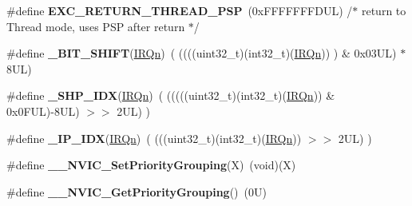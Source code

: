 \begin{DoxyCompactItemize}
\item 
\mbox{\label{group___c_m_s_i_s___core___n_v_i_c_functions_ga9998daf0fbdf31dbc8f81cd604b58175}} 
\#define {\bfseries E\+X\+C\+\_\+\+R\+E\+T\+U\+R\+N\+\_\+\+T\+H\+R\+E\+A\+D\+\_\+\+P\+SP}~(0x\+F\+F\+F\+F\+F\+F\+F\+D\+U\+L)     /$\ast$ return to Thread mode, uses P\+S\+P after return                                $\ast$/
\item 
\mbox{\label{group___c_m_s_i_s___core___n_v_i_c_functions_ga53c75b28823441c6153269f0ecbed878}} 
\#define {\bfseries \+\_\+\+B\+I\+T\+\_\+\+S\+H\+I\+FT}(\mbox{\hyperlink{group___interrupt__vector__numbers_ga666eb0caeb12ec0e281415592ae89083}{I\+R\+Qn}})~(  ((((uint32\+\_\+t)(int32\+\_\+t)(\mbox{\hyperlink{group___interrupt__vector__numbers_ga666eb0caeb12ec0e281415592ae89083}{I\+R\+Qn}}))         )      \&  0x03\+U\+L) $\ast$ 8\+U\+L)
\item 
\mbox{\label{group___c_m_s_i_s___core___n_v_i_c_functions_gaee4f7eb5d7e770ad51489dbceabb1755}} 
\#define {\bfseries \+\_\+\+S\+H\+P\+\_\+\+I\+DX}(\mbox{\hyperlink{group___interrupt__vector__numbers_ga666eb0caeb12ec0e281415592ae89083}{I\+R\+Qn}})~( (((((uint32\+\_\+t)(int32\+\_\+t)(\mbox{\hyperlink{group___interrupt__vector__numbers_ga666eb0caeb12ec0e281415592ae89083}{I\+R\+Qn}})) \& 0x0\+F\+U\+L)-\/8\+U\+L) $>$$>$    2\+U\+L)      )
\item 
\mbox{\label{group___c_m_s_i_s___core___n_v_i_c_functions_ga370ec4b1751a6a889d849747df3763a9}} 
\#define {\bfseries \+\_\+\+I\+P\+\_\+\+I\+DX}(\mbox{\hyperlink{group___interrupt__vector__numbers_ga666eb0caeb12ec0e281415592ae89083}{I\+R\+Qn}})~(   (((uint32\+\_\+t)(int32\+\_\+t)(\mbox{\hyperlink{group___interrupt__vector__numbers_ga666eb0caeb12ec0e281415592ae89083}{I\+R\+Qn}}))                $>$$>$    2\+U\+L)      )
\item 
\mbox{\label{group___c_m_s_i_s___core___n_v_i_c_functions_ga6834dd8c9c59394f1b544b57665293a4}} 
\#define {\bfseries \+\_\+\+\_\+\+N\+V\+I\+C\+\_\+\+Set\+Priority\+Grouping}(X)~(void)(X)
\item 
\mbox{\label{group___c_m_s_i_s___core___n_v_i_c_functions_gab2072fe50f6d7cd208f6768919f59fae}} 
\#define {\bfseries \+\_\+\+\_\+\+N\+V\+I\+C\+\_\+\+Get\+Priority\+Grouping}()~(0\+U)
\end{DoxyCompactItemize}

